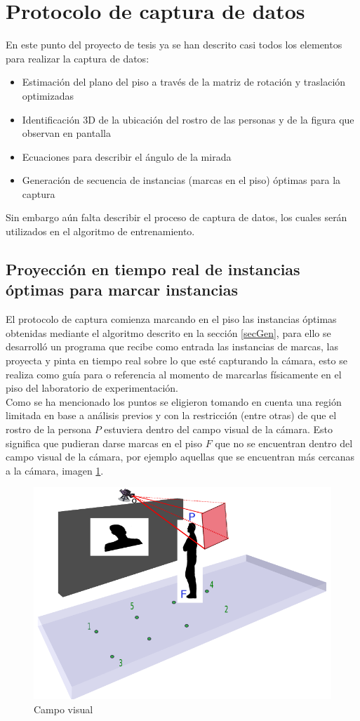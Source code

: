 \section{Protocolo de captura de datos}
En este punto del proyecto de tesis ya se han descrito casi todos los elementos para realizar la captura de datos:
\begin{itemize}
	\item Estimación del plano del piso a través de la matriz de rotación y traslación optimizadas
	\item Identificación 3D de la ubicación del rostro de las personas y de la figura que observan en pantalla
	\item Ecuaciones para describir el ángulo de la mirada
	\item Generación de secuencia de instancias (marcas en el piso) óptimas para la captura
\end{itemize}
Sin embargo aún falta describir el proceso de captura de datos, los cuales serán utilizados en el algoritmo de entrenamiento. 
\subsection{Proyección en tiempo real de instancias óptimas para marcar instancias}
El protocolo de captura comienza marcando en el piso las instancias óptimas obtenidas mediante el algoritmo descrito en la sección \ref{secGen}, para ello se desarrolló un programa que recibe como entrada las instancias de marcas, las proyecta y pinta en tiempo real sobre lo que esté capturando la cámara, esto se realiza como guía para o referencia al momento de marcarlas físicamente en el piso del laboratorio de experimentación.\\

Como se ha mencionado los puntos se eligieron tomando en cuenta una región limitada en base a análisis previos y con la restricción (entre otras) de que el rostro de la persona $P$ estuviera dentro del campo visual de la cámara. Esto significa que pudieran darse marcas en el piso $F$ que no se encuentran dentro del campo visual de la cámara, por ejemplo aquellas que se encuentran más cercanas a la cámara, imagen \ref{fig: figVisualFieldIm}.
	\begin{figure}[htbp]
		\centering
		\includegraphics[width=.47\textwidth]{./pictures/visualFieldIm}
		\caption{Campo visual}\label{fig: figVisualFieldIm}
	\end{figure}

